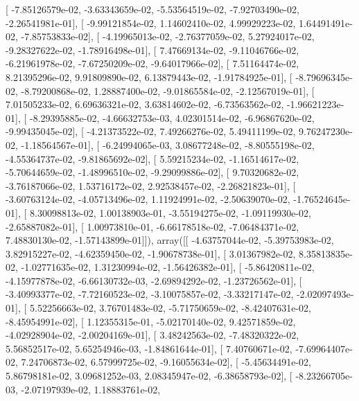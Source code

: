 \documentclass{article}
\begin{document}
       [ -7.85126579e-02,  -3.63343659e-02,  -5.53564519e-02,
         -7.92703490e-02,  -2.26541981e-01],
       [ -9.99121854e-02,   1.14602410e-02,   4.99929223e-02,
          1.64491491e-02,  -7.85753833e-02],
       [ -4.19965013e-02,  -2.76377059e-02,   5.27924017e-02,
         -9.28327622e-02,  -1.78916498e-01],
       [  7.47669134e-02,  -9.11046766e-02,  -6.21961978e-02,
         -7.67250209e-02,  -9.64017966e-02],
       [  7.51164474e-02,   8.21395296e-02,   9.91809890e-02,
          6.13879443e-02,  -1.91784925e-01],
       [ -8.79696345e-02,  -8.79200868e-02,   1.28887400e-02,
         -9.01865584e-02,  -2.12567019e-01],
       [  7.01505233e-02,   6.69636321e-02,   3.63814602e-02,
         -6.73563562e-02,  -1.96621223e-01],
       [ -8.29395885e-02,  -4.66632753e-03,   4.02301514e-02,
         -6.96867620e-02,  -9.99435045e-02],
       [ -4.21373522e-02,   7.49266276e-02,   5.49411199e-02,
          9.76247230e-02,  -1.18564567e-01],
       [ -6.24994065e-03,   3.08677248e-02,  -8.80555198e-02,
         -4.55364737e-02,  -9.81865692e-02],
       [  5.59215234e-02,  -1.16514617e-02,  -5.70644659e-02,
         -1.48996510e-02,  -9.29099886e-02],
       [  9.70320682e-02,  -3.76187066e-02,   1.53716172e-02,
          2.92538457e-02,  -2.26821823e-01],
       [ -3.60763124e-02,  -4.05713496e-02,   1.11924991e-02,
         -2.50639070e-02,  -1.76524645e-01],
       [  8.30098813e-02,   1.00138903e-01,  -3.55194275e-02,
         -1.09119930e-02,  -2.65887082e-01],
       [  1.00973810e-01,  -6.66178518e-02,  -7.06484371e-02,
          7.48830130e-02,  -1.57143899e-01]]), array([[ -4.63757044e-02,  -5.39753983e-02,   3.82915227e-02,
         -4.62359450e-02,  -1.90678738e-01],
       [  3.01367982e-02,   8.35813835e-02,  -1.02771635e-02,
          1.31230994e-02,  -1.56426382e-01],
       [ -5.86420811e-02,  -4.15977878e-02,  -6.66130732e-03,
         -2.69894292e-02,  -1.23726562e-01],
       [ -3.40993377e-02,  -7.72160523e-02,  -3.10075857e-02,
         -3.33217147e-02,  -2.02097493e-01],
       [  5.52256663e-02,   3.76701483e-02,  -5.71750659e-02,
         -8.42407631e-02,  -8.45954991e-02],
       [  1.12355315e-01,  -5.02170140e-02,   9.42571859e-02,
         -4.02928904e-02,  -2.00204169e-01],
       [  3.48242563e-02,  -7.48320322e-02,   5.56852517e-02,
          5.65254946e-03,  -1.84861644e-01],
       [  7.40760671e-02,  -7.69964407e-02,   7.24706873e-02,
          6.57999725e-02,  -9.16055634e-02],
       [ -5.45634491e-02,   5.86798181e-02,   3.09681252e-03,
          2.08345947e-02,  -6.38658793e-02],
       [ -8.23266705e-03,  -2.07197939e-02,   1.18883761e-02,
\end{document}
